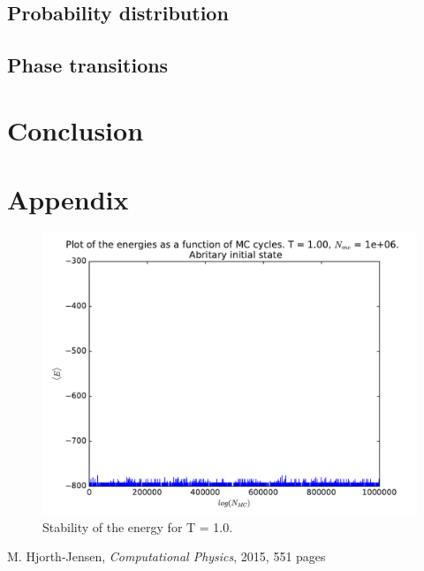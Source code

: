 \documentclass[12pt]{article}
\begin{document}
\FloatBarrier
\subsection*{Probability distribution}

\FloatBarrier
\subsection*{Phase transitions}

\FloatBarrier
\section{Conclusion} \label{section:conclusion}

\FloatBarrier

\section{Appendix}
\begin{figure}[hbtp]
\centering
\includegraphics[width=\linewidth]{Plots/Energy_stability_T1.pdf}
\caption{Stability of the energy for T = 1.0.}
\end{figure}


\FloatBarrier
\begin{thebibliography}{1}
     M. Hjorth-Jensen, \emph{Computational Physics}, 2015, 551 pages
\end{thebibliography}
\end{document}
